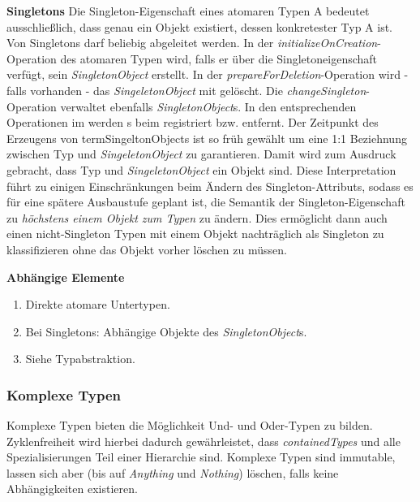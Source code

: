 \textbf{Singletons} \newline
Die Singleton-Eigenschaft eines atomaren Typen A bedeutet ausschließlich, dass genau ein Objekt existiert, dessen konkretester Typ A ist.
Von Singletons darf beliebig abgeleitet werden. 
In der \emph{initializeOnCreation}-Operation des atomaren Typen wird, falls er über die Singletoneigenschaft verfügt, 
sein \emph{SingletonObject} erstellt. In der \emph{prepareForDeletion}-Operation wird - falls vorhanden - das \emph{SingeletonObject}
mit gelöscht. Die \emph{changeSingleton}-Operation verwaltet ebenfalls \emph{SingletonObject}s. In den entsprechenden Operationen im 
 werden s beim  registriert bzw. entfernt.
Der Zeitpunkt des Erzeugens von term{SingeltonObject}s ist so früh gewählt um eine 1:1 Beziehnung zwischen Typ und \emph{SingeletonObject} zu garantieren.
Damit wird zum Ausdruck gebracht, dass Typ und \emph{SingeletonObject} ein Objekt sind. Diese Interpretation führt zu einigen Einschränkungen beim Ändern des Singleton-Attributs, 
sodass es für eine spätere Ausbaustufe geplant ist, die Semantik der Singleton-Eigenschaft zu \emph{höchstens einem Objekt zum Typen} zu ändern. Dies ermöglicht dann 
auch einen nicht-Singleton Typen mit einem Objekt nachträglich als Singleton zu klassifizieren ohne das Objekt vorher löschen zu müssen.  
 
\newpage
\textbf{Abhängige Elemente}
\begin{enumerate}
  		\item Direkte atomare Untertypen.
  		\item Bei Singletons: Abhängige Objekte des \emph{SingletonObject}s.
  		\item Siehe Typabstraktion.
\end{enumerate}

\subsubsection{Komplexe Typen}

Komplexe Typen bieten die Möglichkeit Und- und Oder-Typen zu bilden. Zyklenfreiheit wird hierbei dadurch gewährleistet, 
dass \emph{containedTypes} und alle Spezialisierungen Teil einer Hierarchie sind. Komplexe Typen sind immutable,
lassen sich aber (bis auf \emph{Anything} und \emph{Nothing}) löschen, falls keine Abhängigkeiten existieren.


